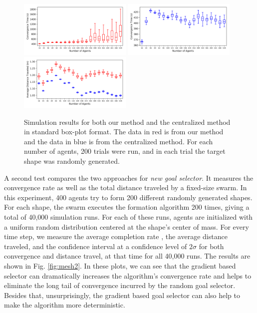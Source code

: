 \documentclass[journal]{IEEEtran}
\begin{document}
\begin{figure}[h!]
    \centering
    \includegraphics[trim=11pt 10pt 10pt 8pt, clip, width=0.48\textwidth]{variance/time_our.png}
    \includegraphics[trim=10pt 10pt 10pt 5pt, clip,width=0.48\textwidth]{variance/time_opt.png}
    \includegraphics[trim=10pt 10pt 10pt 5pt, clip,width=0.48\textwidth]{variance/distance_our.png}
    \caption{Simulation results for both our method and the centralized method \cite{centralized} in standard box-plot format. The data in red is from our method and the data in blue is from the centralized method. For each number of agents, 200 trials were run, and in each trial the target shape was randomly generated. }
    \label{fig:mesh1}
\end{figure}

A second test compares the two approaches for \textit{new goal selector}.  It measures the convergence rate as well as the total distance traveled by a fixed-size swarm. In this experiment, 400 agents try to form 200 different randomly generated shapes. For each shape, the swarm executes the formation algorithm 200 times, giving a total of 40,000 simulation runs.  For each of these runs, agents are initialized with a uniform random distribution centered at the shape's center of mass. For every time step, we measure the average completion rate , the average distance traveled, and the confidence interval at a confidence level of $2\sigma$ for both convergence and distance travel, at that time for all 40,000 runs. The results are shown in Fig. \ref{fig:mesh2}. In these plots, we can see that the gradient based selector can dramatically increases the algorithm's convergence rate and helps to eliminate the long tail of convergence incurred by the random goal selector. Besides that, unsurprisingly, the gradient based goal selector can also help to make the algorithm more deterministic. 
\end{document}
